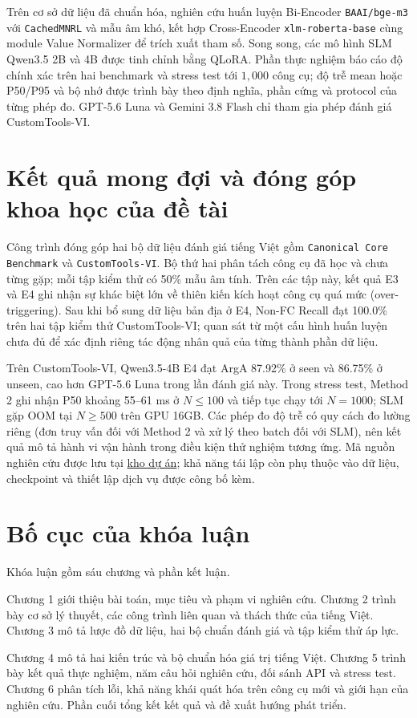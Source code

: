 Trên cơ sở dữ liệu đã chuẩn hóa, nghiên cứu huấn luyện Bi-Encoder \texttt{BAAI/bge-m3} với \texttt{CachedMNRL} và mẫu âm khó, kết hợp Cross-Encoder \texttt{xlm-roberta-base} cùng module Value Normalizer để trích xuất tham số. Song song, các mô hình SLM Qwen3.5 2B và 4B được tinh chỉnh bằng QLoRA. Phần thực nghiệm báo cáo độ chính xác trên hai benchmark và stress test tới $1{,}000$ công cụ; độ trễ mean hoặc P50/P95 và bộ nhớ được trình bày theo định nghĩa, phần cứng và protocol của từng phép đo. GPT-5.6 Luna và Gemini 3.8 Flash chỉ tham gia phép đánh giá CustomTools-VI.

\section{Kết quả mong đợi và đóng góp khoa học của đề tài}
Công trình đóng góp hai bộ dữ liệu đánh giá tiếng Việt gồm \texttt{Canonical Core Benchmark} và \texttt{CustomTools-VI}. Bộ thứ hai phân tách công cụ đã học và chưa từng gặp; mỗi tập kiểm thử có 50\% mẫu âm tính. Trên các tập này, kết quả E3 và E4 ghi nhận sự khác biệt lớn về thiên kiến kích hoạt công cụ quá mức (over-triggering). Sau khi bổ sung dữ liệu bản địa ở E4, Non-FC Recall đạt 100.0\% trên hai tập kiểm thử CustomTools-VI; quan sát từ một cấu hình huấn luyện chưa đủ để xác định riêng tác động nhân quả của từng thành phần dữ liệu.

Trên CustomTools-VI, Qwen3.5-4B E4 đạt ArgA 87.92\% ở seen và 86.75\% ở unseen, cao hơn GPT-5.6 Luna trong lần đánh giá này. Trong stress test, Method 2 ghi nhận P50 khoảng 55–61 ms ở $N \le 100$ và tiếp tục chạy tới $N=1000$; SLM gặp OOM tại $N \ge 500$ trên GPU 16GB. Các phép đo độ trễ có quy cách đo lường riêng (đơn truy vấn đối với Method 2 và xử lý theo batch đối với SLM), nên kết quả mô tả hành vi vận hành trong điều kiện thử nghiệm tương ứng. Mã nguồn nghiên cứu được lưu tại \href{https://github.com/TristanDao/tool\_calling\_with\_retrieval\_extraction}{kho dự án}; khả năng tái lập còn phụ thuộc vào dữ liệu, checkpoint và thiết lập dịch vụ được công bố kèm.

\section{Bố cục của khóa luận}
Khóa luận gồm sáu chương và phần kết luận.

Chương 1 giới thiệu bài toán, mục tiêu và phạm vi nghiên cứu. Chương 2 trình bày cơ sở lý thuyết, các công trình liên quan và thách thức của tiếng Việt. Chương 3 mô tả lược đồ dữ liệu, hai bộ chuẩn đánh giá và tập kiểm thử áp lực.

Chương 4 mô tả hai kiến trúc và bộ chuẩn hóa giá trị tiếng Việt. Chương 5 trình bày kết quả thực nghiệm, năm câu hỏi nghiên cứu, đối sánh API và stress test. Chương 6 phân tích lỗi, khả năng khái quát hóa trên công cụ mới và giới hạn của nghiên cứu. Phần cuối tổng kết kết quả và đề xuất hướng phát triển.


